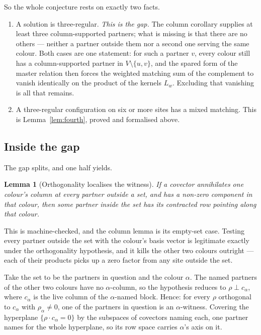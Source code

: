 \documentclass[11pt]{article}
\newtheorem{lemma}[theorem]{Lemma}
\theoremstyle{definition}
\theoremstyle{remark}
\begin{document}
So the whole conjecture rests on exactly two facts.

\begin{enumerate}
\item A solution is three-regular. \emph{This is the gap.} The column corollary supplies
at least three column-supported partners; what is missing is that there are no others ---
neither a partner outside them nor a second one serving the same colour. Both cases are
one statement: for such a partner $v$, every colour still has a column-supported partner in
$V \setminus \{u,v\}$, and the spared form of the master relation then forces the weighted
matching sum of the complement to vanish identically on the product of the kernels $L_w$.
Excluding that vanishing is all that remains.
\item A three-regular configuration on six or more sites has a mixed matching. This is
Lemma~\ref{lem:fourth}, proved and formalised above.
\end{enumerate}

\subsection*{Inside the gap}

The gap splits, and one half yields.

\begin{lemma}[Orthogonality localises the witness]\label{lem:localise}
If a covector annihilates one colour's column at every partner outside a set, and has a
non-zero component in that colour, then some partner inside the set has its contracted row
pointing along that colour.
\end{lemma}

This is machine-checked, and the column lemma is its empty-set case. Testing every partner
outside the set with the colour's basis vector is legitimate exactly under the
orthogonality hypothesis, and it kills the other two colours outright --- each of their
products picks up a zero factor from any site outside the set.

Take the set to be the partners in question and the colour $\alpha$. The named partners of
the other two colours have no $\alpha$-column, so the hypothesis reduces to
$\rho \perp c_\alpha$, where $c_\alpha$ is the live column of the $\alpha$-named block.
Hence: for every $\rho$ orthogonal to $c_\alpha$ with $\rho_\alpha \neq 0$, one of the
partners in question is an $\alpha$-witness. Covering the hyperplane
$\{\rho \cdot c_\alpha = 0\}$ by the subspaces of covectors naming each, one partner names
for the whole hyperplane, so its row space carries $\alpha$'s axis on it.
\end{document}
